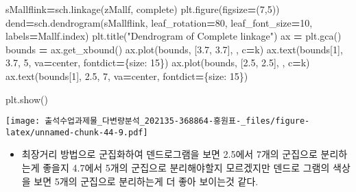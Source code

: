 \documentclass[
]{article}
\newenvironment{Shaded}{\begin{snugshade}}{\end{snugshade}}
\newcommand{\DecValTok}[1]{\textcolor[rgb]{0.00,0.00,0.81}{#1}}
\newcommand{\FloatTok}[1]{\textcolor[rgb]{0.00,0.00,0.81}{#1}}
\newcommand{\NormalTok}[1]{#1}
\newcommand{\OperatorTok}[1]{\textcolor[rgb]{0.81,0.36,0.00}{\textbf{#1}}}
\newcommand{\StringTok}[1]{\textcolor[rgb]{0.31,0.60,0.02}{#1}}
\providecommand{\tightlist}{%
  \setlength{\itemsep}{0pt}\setlength{\parskip}{0pt}}
\begin{document}
\begin{Shaded}
\begin{Highlighting}[]
\NormalTok{sMallflink}\OperatorTok{=}\NormalTok{sch.linkage(zMallf, }\StringTok{\textquotesingle{}complete\textquotesingle{}}\NormalTok{)}
\NormalTok{plt.figure(figsize}\OperatorTok{=}\NormalTok{(}\DecValTok{7}\NormalTok{,}\DecValTok{5}\NormalTok{))}
\NormalTok{dend}\OperatorTok{=}\NormalTok{sch.dendrogram(sMallflink, leaf\_rotation}\OperatorTok{=}\DecValTok{80}\NormalTok{, leaf\_font\_size}\OperatorTok{=}\DecValTok{10}\NormalTok{, labels}\OperatorTok{=}\NormalTok{Mallf.index)}
\NormalTok{plt.title(}\StringTok{"Dendrogram of Complete linkage"}\NormalTok{)}
\NormalTok{ax }\OperatorTok{=}\NormalTok{ plt.gca() }
\NormalTok{bounds }\OperatorTok{=}\NormalTok{ ax.get\_xbound() }
\NormalTok{ax.plot(bounds, [}\FloatTok{3.7}\NormalTok{, }\FloatTok{3.7}\NormalTok{], }\StringTok{\textquotesingle{}{-}{-}\textquotesingle{}}\NormalTok{, c}\OperatorTok{=}\StringTok{\textquotesingle{}k\textquotesingle{}}\NormalTok{)}
\NormalTok{ax.text(bounds[}\DecValTok{1}\NormalTok{], }\FloatTok{3.7}\NormalTok{, }\StringTok{\textquotesingle{}5\textquotesingle{}}\NormalTok{, va}\OperatorTok{=}\StringTok{\textquotesingle{}center\textquotesingle{}}\NormalTok{, fontdict}\OperatorTok{=}\NormalTok{\{}\StringTok{\textquotesingle{}size\textquotesingle{}}\NormalTok{: }\DecValTok{15}\NormalTok{\})}
\NormalTok{ax.plot(bounds, [}\FloatTok{2.5}\NormalTok{, }\FloatTok{2.5}\NormalTok{], }\StringTok{\textquotesingle{}{-}{-}\textquotesingle{}}\NormalTok{, c}\OperatorTok{=}\StringTok{\textquotesingle{}k\textquotesingle{}}\NormalTok{)}
\NormalTok{ax.text(bounds[}\DecValTok{1}\NormalTok{], }\FloatTok{2.5}\NormalTok{, }\StringTok{\textquotesingle{}7\textquotesingle{}}\NormalTok{, va}\OperatorTok{=}\StringTok{\textquotesingle{}center\textquotesingle{}}\NormalTok{, fontdict}\OperatorTok{=}\NormalTok{\{}\StringTok{\textquotesingle{}size\textquotesingle{}}\NormalTok{: }\DecValTok{15}\NormalTok{\})}


\NormalTok{plt.show() }
\end{Highlighting}
\end{Shaded}

\texttt{[image: 출석수업과제물\_다변량분석\_202135-368864-홍원표-\_files/figure-latex/unnamed-chunk-44-9.pdf]}

\begin{itemize}
\tightlist
\item
  최장거리 방법으로 군집화하여 덴드로그램을 보면 2.5에서 7개의 군집으로
  분리하는게 좋을지 4.7에서 5개의 군집으로 분리해야할지 모르겠지만
  덴드로 그램의 색상을 보면 5개의 군집으로 분리하는게 더 좋아 보이는것
  같다.
\end{itemize}
\end{document}
